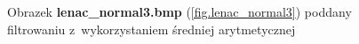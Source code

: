 \documentclass{classrep}
\begin{document}
\begin{figure}
{{  \label{fig.lenac_normal3_average_5x5}
 }
}
\caption{Obrazek \textbf{lenac\_normal3.bmp} (\ref{fig.lenac_normal3}) poddany filtrowaniu z~wykorzystaniem średniej arytmetycznej}
\label{fig.lenac_normal3_average}
\end{figure}
\end{document}
